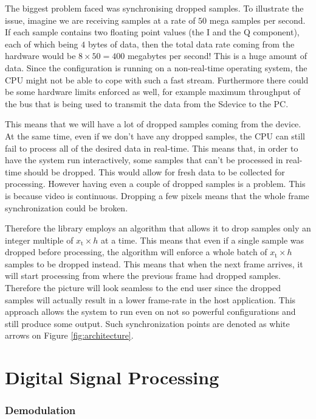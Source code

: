 \documentclass[a4paper,12pt,twoside,openright]{report}
\begin{document}
The biggest problem faced was synchronising dropped samples. To illustrate the issue, imagine we are receiving samples at a rate of $50$ mega samples per second. If each sample contains two floating point values (the I and the Q component), each of which being $4$ bytes of data, then the total data rate coming from the hardware would be $8 \times 50 = 400$ megabytes per second! This is a huge amount of data. Since the configuration is running on a non-real-time operating system, the CPU might not be able to cope with such a fast stream. Furthermore there could be some hardware limits enforced as well, for example maximum throughput of the bus that is being used to transmit the data from the Sdevice to the PC.

This means that we will have a lot of dropped samples coming from the device. At the same time, even if we don't have any dropped samples, the CPU can still fail to process all of the desired data in real-time. This means that, in order to have the system run interactively, some samples that can't be processed in real-time should be dropped. This would allow for fresh data to be collected for processing. However having even a couple of dropped samples is a problem. This is because video is continuous. Dropping a few pixels means that the whole frame synchronization could be broken.

Therefore the library employs an algorithm that allows it to drop samples only an integer multiple of $x_\text{t} \times h$ at a time. This means that even if a single sample was dropped before processing, the algorithm will enforce a whole batch of $x_\text{t} \times h$ samples to be dropped instead. This means that when the next frame arrives, it will start processing from where the previous frame had dropped samples. Therefore the picture will look seamless to the end user since the dropped samples will actually result in a lower frame-rate in the host application. This approach allows the system to run even on not so powerful configurations and still produce some output. Such synchronization points are denoted as white arrows on Figure \ref{fig:architecture}.

\section{Digital Signal Processing}

\subsubsection{Demodulation}
\end{document}
